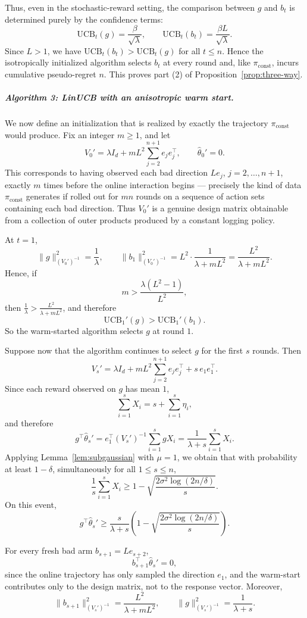 \documentclass{article}
\theoremstyle{definition}
\theoremstyle{remark}
\theoremstyle{remark}
\begin{document}
Thus, even in the stochastic-reward setting, the comparison between $g$ and $b_t$ is determined purely by the confidence terms:
\[
\mathrm{UCB}_t(g)=\frac{\beta}{\sqrt{\lambda}},
\qquad
\mathrm{UCB}_t(b_t)=\frac{\beta L}{\sqrt{\lambda}}.
\]
Since $L>1$, we have $\mathrm{UCB}_t(b_t)>\mathrm{UCB}_t(g)$ for all $t\le n$. Hence the isotropically initialized algorithm selects $b_t$ at every round and, like $\pi_{\mathrm{const}}$, incurs cumulative pseudo-regret $n$. This proves part (2) of Proposition~\ref{prop:three-way}.

\subparagraph{Algorithm 3: LinUCB with an anisotropic warm start.}
We now define an initialization that is realized by exactly the trajectory $\pi_{\mathrm{const}}$ would produce. Fix an integer $m\ge 1$, and let
\[
V_0'
=
\lambda I_d + mL^2 \sum_{j=2}^{n+1} e_j e_j^\top,
\qquad
\hat{\theta}_0'=0.
\]
This corresponds to having observed each bad direction $L e_j$, $j=2,\dots,n+1$, exactly $m$ times before the online interaction begins --- precisely the kind of data $\pi_{\mathrm{const}}$ generates if rolled out for $mn$ rounds on a sequence of action sets containing each bad direction. Thus $V_0'$ is a genuine design matrix obtainable from a collection of outer products produced by a constant logging policy.

At $t=1$,
\[
\|g\|_{(V_0')^{-1}}^2=\frac{1}{\lambda},
\qquad
\|b_1\|_{(V_0')^{-1}}^2
=
L^2\cdot \frac{1}{\lambda+mL^2}
=
\frac{L^2}{\lambda+mL^2}.
\]
Hence, if
\[
m > \frac{\lambda(L^2-1)}{L^2},
\]
then $\frac{1}{\lambda}>\frac{L^2}{\lambda+mL^2}$, and therefore
\[
\mathrm{UCB}_1'(g)>\mathrm{UCB}_1'(b_1).
\]
So the warm-started algorithm selects $g$ at round $1$.

Suppose now that the algorithm continues to select $g$ for the first $s$ rounds. Then
\[
V_s'
=
\lambda I_d
+
mL^2 \sum_{j=2}^{n+1} e_j e_j^\top
+
s\, e_1 e_1^\top.
\]
Since each reward observed on $g$ has mean $1$,
\[
\sum_{i=1}^s X_i = s + \sum_{i=1}^s \eta_i,
\]
and therefore
\[
g^\top \hat{\theta}_s'
=
e_1^\top (V_s')^{-1}\sum_{i=1}^s g X_i
=
\frac{1}{\lambda+s}\sum_{i=1}^s X_i.
\]
Applying Lemma~\ref{lem:subgaussian} with $\mu=1$, we obtain that with probability at least $1-\delta$, simultaneously for all $1\le s\le n$,
\[
\frac{1}{s}\sum_{i=1}^s X_i
\ge
1-\sqrt{\frac{2\sigma^2\log(2n/\delta)}{s}}.
\]
On this event,
\[
g^\top \hat{\theta}_s'
\ge
\frac{s}{\lambda+s}
\left(
1-\sqrt{\frac{2\sigma^2\log(2n/\delta)}{s}}
\right).
\]

For every fresh bad arm $b_{s+1}=Le_{s+2}$,
\[
b_{s+1}^\top \hat{\theta}_s' = 0,
\]
since the online trajectory has only sampled the direction $e_1$, and the warm-start contributes only to the design matrix, not to the response vector. Moreover,
\[
\|b_{s+1}\|_{(V_s')^{-1}}^2
=
\frac{L^2}{\lambda+mL^2},
\qquad
\|g\|_{(V_s')^{-1}}^2
=
\frac{1}{\lambda+s}.
\]
\end{document}
